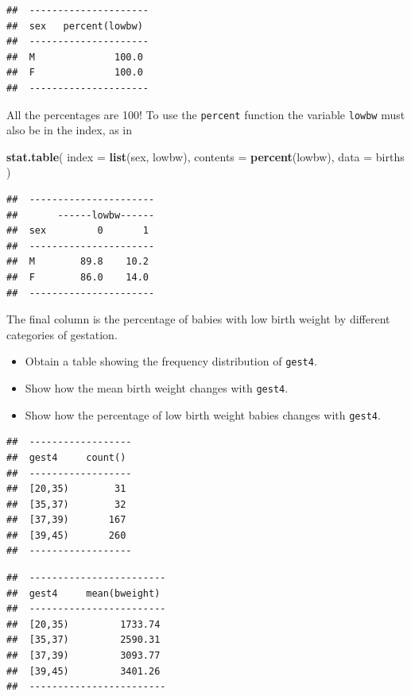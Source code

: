 \documentclass[
]{book}
\newenvironment{Shaded}{\begin{snugshade}}{\end{snugshade}}
\newcommand{\AttributeTok}[1]{\textcolor[rgb]{0.13,0.29,0.53}{#1}}
\newcommand{\FunctionTok}[1]{\textcolor[rgb]{0.13,0.29,0.53}{\textbf{#1}}}
\newcommand{\NormalTok}[1]{#1}
\providecommand{\tightlist}{%
  \setlength{\itemsep}{0pt}\setlength{\parskip}{0pt}}
\begin{document}
\begin{verbatim}
##  --------------------- 
##  sex   percent(lowbw)  
##  --------------------- 
##  M              100.0  
##  F              100.0  
##  ---------------------
\end{verbatim}

All the percentages are 100! To use the \texttt{percent} function the variable \texttt{lowbw} must also be in the index, as in

\begin{Shaded}
\begin{Highlighting}[]
\FunctionTok{stat.table}\NormalTok{(}
  \AttributeTok{index =} \FunctionTok{list}\NormalTok{(sex, lowbw), }
  \AttributeTok{contents =} \FunctionTok{percent}\NormalTok{(lowbw), }
  \AttributeTok{data =}\NormalTok{ births}
\NormalTok{)}
\end{Highlighting}
\end{Shaded}

\begin{verbatim}
##  ---------------------- 
##       ------lowbw------ 
##  sex         0       1  
##  ---------------------- 
##  M        89.8    10.2  
##  F        86.0    14.0  
##  ----------------------
\end{verbatim}

The final column is the percentage of babies with low birth weight by different categories of gestation.

\begin{itemize}
\tightlist
\item
  Obtain a table showing the frequency distribution of \texttt{gest4}.
\item
  Show how the mean birth weight changes with \texttt{gest4}.
\item
  Show how the percentage of low birth weight babies changes with \texttt{gest4}.
\end{itemize}

\begin{verbatim}
##  ------------------ 
##  gest4     count()  
##  ------------------ 
##  [20,35)        31  
##  [35,37)        32  
##  [37,39)       167  
##  [39,45)       260  
##  ------------------
\end{verbatim}

\begin{verbatim}
##  ------------------------ 
##  gest4     mean(bweight)  
##  ------------------------ 
##  [20,35)         1733.74  
##  [35,37)         2590.31  
##  [37,39)         3093.77  
##  [39,45)         3401.26  
##  ------------------------
\end{verbatim}
\end{document}
